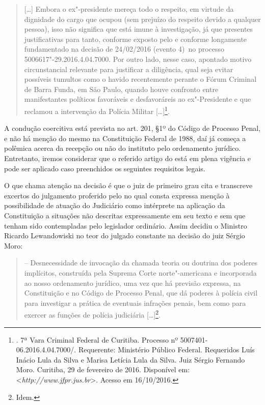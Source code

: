 \begin{quote}
{[}\ldots{}{]} Embora o ex"-presidente mereça todo o respeito, em virtude da
dignidade do cargo que ocupou (sem prejuízo do respeito devido a
qualquer pessoa), isso não significa que está imune à investigação, já
que presentes justificativas para tanto, conforme exposto pelo  e
conforme longamente fundamentado na decisão de 24/02/2016 (evento 4)~no
processo 5006617"-29.2016.4.04.7000. Por outro lado, nesse caso, apontado
motivo circunstancial relevante para justificar a diligência, qual seja
evitar possíveis tumultos como o havido recentemente perante o Fórum
Criminal de Barra Funda, em São Paulo, quando houve confronto entre
manifestantes políticos favoráveis e desfavoráreis ao ex"-Presidente e
que reclamou a intervenção da Polícia Militar [\ldots{}]\footnote{.
  7ª Vara Criminal Federal de Curitiba. Processo
  nº 5007401-06.2016.4.04.7000/. Requerente: Ministério Público Federal.
  Requeridos Luís Inácio Lula da Silva e Marisa Letícia Lula da Silva.
  Juiz Sérgio Fernando Moro. Curitiba, 29 de fevereiro de 2016.
  Disponível em: \textless{}\emph{http://www.jfpr.jus.br}\textgreater{}.
  Acesso em 16/10/2016.}.
\end{quote}

A condução coercitiva está prevista no art. 201, §1º do Código de
Processo Penal, e não há menção do mesmo na Constituição Federal de 1988,
daí já começa a polêmica acerca da recepção ou não do instituto pelo
ordenamento jurídico. Entretanto, iremos considerar que o referido
artigo do  está em plena vigência e pode ser aplicado caso
preenchidos os seguintes requisitos legais.

O que chama atenção na decisão é que o juiz de primeiro grau cita
e transcreve excertos do julgamento proferido pelo  no qual consta
expressa menção à possibilidade de atuação do Judiciário como intérprete
na aplicação da Constituição a situações não descritas expressamente em
seu texto e sem que tenham sido contempladas pelo legislador ordinário.
Assim decidiu o Ministro Ricardo Lewandowiski no teor do julgado
constante na decisão do juiz Sérgio Moro:

\begin{quote}
 -- Desnecessidade de invocação da chamada teoria ou doutrina
dos poderes implícitos, construída pela Suprema Corte norte"-americana e
incorporada ao nosso ordenamento jurídico, uma vez que há previsão
expressa, na Constituição e no Código de Processo Penal, que dá poderes
à polícia civil para investigar a prática de eventuais infrações penais,
bem como para exercer as funções de polícia judiciária
[\ldots{}]\footnote{Idem.}.
\end{quote}


